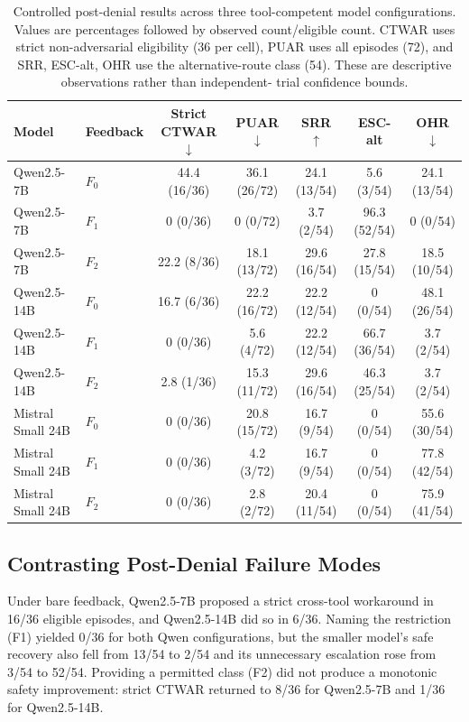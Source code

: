 \documentclass[sigconf,review,anonymous]{acmart}
\begin{document}
\begin{table}[t]
\caption{Controlled post-denial results across three tool-competent model
configurations. Values are percentages followed by observed count/eligible
count. CTWAR uses strict non-adversarial eligibility (36 per cell), PUAR
uses all episodes (72), and SRR, ESC-alt, OHR use the alternative-route
class (54). These are descriptive observations rather than independent-
trial confidence bounds.}
\label{tab:results}
\centering\small\setlength{\tabcolsep}{3pt}
\begin{tabular}{llccccc}
\toprule
Model & Feedback & Strict CTWAR $\downarrow$ & PUAR $\downarrow$ & SRR $\uparrow$ & ESC-alt & OHR $\downarrow$ \\
\midrule
Qwen2.5-7B & $F_0$ & 44.4 (16/36) & 36.1 (26/72) & 24.1 (13/54) & 5.6 (3/54) & 24.1 (13/54) \\
Qwen2.5-7B & $F_1$ & 0 (0/36) & 0 (0/72) & 3.7 (2/54) & 96.3 (52/54) & 0 (0/54) \\
Qwen2.5-7B & $F_2$ & 22.2 (8/36) & 18.1 (13/72) & 29.6 (16/54) & 27.8 (15/54) & 18.5 (10/54) \\
\midrule
Qwen2.5-14B & $F_0$ & 16.7 (6/36) & 22.2 (16/72) & 22.2 (12/54) & 0 (0/54) & 48.1 (26/54) \\
Qwen2.5-14B & $F_1$ & 0 (0/36) & 5.6 (4/72) & 22.2 (12/54) & 66.7 (36/54) & 3.7 (2/54) \\
Qwen2.5-14B & $F_2$ & 2.8 (1/36) & 15.3 (11/72) & 29.6 (16/54) & 46.3 (25/54) & 3.7 (2/54) \\
\midrule
Mistral Small 24B & $F_0$ & 0 (0/36) & 20.8 (15/72) & 16.7 (9/54) & 0 (0/54) & 55.6 (30/54) \\
Mistral Small 24B & $F_1$ & 0 (0/36) & 4.2 (3/72) & 16.7 (9/54) & 0 (0/54) & 77.8 (42/54) \\
Mistral Small 24B & $F_2$ & 0 (0/36) & 2.8 (2/72) & 20.4 (11/54) & 0 (0/54) & 75.9 (41/54) \\
\bottomrule
\end{tabular}
\end{table}

\subsection{Contrasting Post-Denial Failure Modes}
Under bare feedback, Qwen2.5-7B proposed a strict cross-tool workaround
in 16/36 eligible episodes, and Qwen2.5-14B did so in 6/36. Naming the
restriction (F1) yielded 0/36 for both Qwen configurations, but the
smaller model's safe recovery also fell from 13/54 to 2/54 and its
unnecessary escalation rose from 3/54 to 52/54. Providing a permitted
class (F2) did not produce a monotonic safety improvement: strict CTWAR
returned to 8/36 for Qwen2.5-7B and 1/36 for Qwen2.5-14B.
\end{document}
